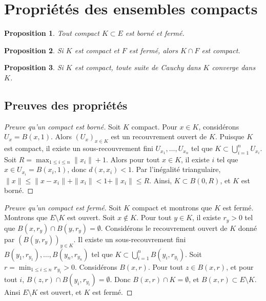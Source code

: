 \documentclass{article}
\newtheorem{proposition}{Proposition}
\begin{document}
\section{Propriétés des ensembles compacts}

\begin{proposition}
Tout compact $K \subset E$ est borné et fermé.
\end{proposition}

\begin{proposition}
Si $K$ est compact et $F$ est fermé, alors $K \cap F$ est compact.
\end{proposition}

\begin{proposition}
Si $K$ est compact, toute suite de Cauchy dans $K$ converge dans $K$.
\end{proposition}

\subsection{Preuves des propriétés}

\begin{proof}[Preuve qu'un compact est borné]
Soit $K$ compact. Pour $x \in K$, considérons $U_x = B(x, 1)$. Alors $(U_x)_{x \in K}$ est un recouvrement ouvert de $K$. Puisque $K$ est compact, il existe un sous-recouvrement fini $U_{x_1}, \dots, U_{x_n}$ tel que $K \subset \bigcup_{i=1}^n U_{x_i}$. Soit $R = \max_{1 \leq i \leq n} \|x_i\| + 1$. Alors pour tout $x \in K$, il existe $i$ tel que $x \in U_{x_i} = B(x_i, 1)$, donc $d(x, x_i) < 1$. Par l'inégalité triangulaire, $\|x\| \leq \|x - x_i\| + \|x_i\| < 1 + \|x_i\| \leq R$. Ainsi, $K \subset B(0, R)$, et $K$ est borné.
\end{proof}

\begin{proof}[Preuve qu'un compact est fermé]
Soit $K$ compact et montrons que $K$ est fermé. Montrons que $E \setminus K$ est ouvert. Soit $x \notin K$. Pour tout $y \in K$, il existe $r_y > 0$ tel que $B(x, r_y) \cap B(y, r_y) = \emptyset$. Considérons le recouvrement ouvert de $K$ donné par $(B(y, r_y))_{y \in K}$. Il existe un sous-recouvrement fini $B(y_1, r_{y_1}), \dots, B(y_n, r_{y_n})$ tel que $K \subset \bigcup_{i=1}^n B(y_i, r_{y_i})$. Soit $r = \min_{1 \leq i \leq n} r_{y_i} > 0$. Considérons $B(x, r)$. Pour tout $z \in B(x, r)$, et pour tout $i$, $B(z, r) \cap B(y_i, r_{y_i}) = \emptyset$. Donc $B(x, r) \cap K = \emptyset$, et $B(x, r) \subset E \setminus K$. Ainsi $E \setminus K$ est ouvert, et $K$ est fermé.
\end{proof}
\end{document}
